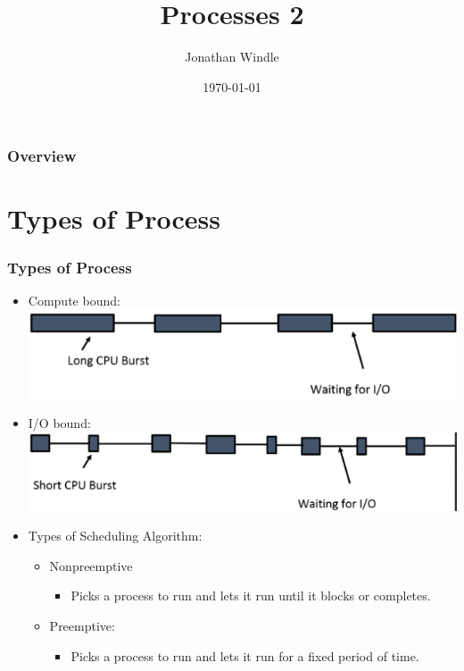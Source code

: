\documentclass{beamer}
\title[Processes 2]{Processes 2} %
\author{Jonathan Windle} %
\institute[UEA] %
{
University of East Anglia \\ %
\medskip
\textit{J.Windle@uea.ac.uk} %
}
\date{\today} %
\begin{document}
\begin{frame}
\titlepage %
\end{frame}

\begin{frame}[allowframebreaks]
\frametitle{Overview} %
\tableofcontents %
\end{frame}

\section{Types of Process}
\begin{frame}
\frametitle{Types of Process}
\begin{itemize}
\item Compute bound:\\
\includegraphics[scale=0.3]{compute.png}
\item I/O bound:\\
\includegraphics[scale=0.3]{io.png}\\
\item Types of Scheduling Algorithm:
\begin{itemize}
\item Nonpreemptive
\begin{itemize}
\item Picks a process to run and lets it run until it blocks or completes.
\end{itemize}
\item Preemptive:
\begin{itemize}
\item Picks a process to run and lets it run for a fixed period of time.
\end{itemize}
\end{itemize}
\end{itemize}
\end{frame}
\end{document}
